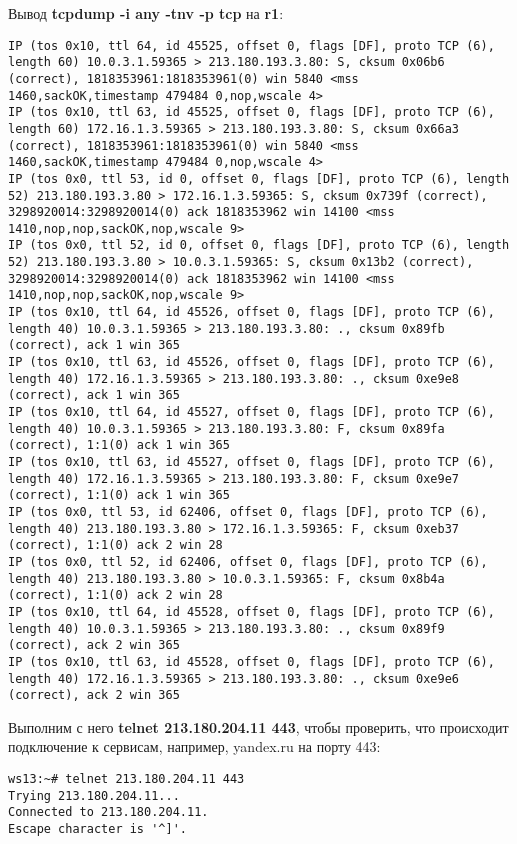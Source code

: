 \documentclass[a4paper,12pt]{article}
\begin{document}
Вывод \textbf{tcpdump -i any -tnv -p tcp} на \textbf{r1}:
\begin{Verbatim}
IP (tos 0x10, ttl 64, id 45525, offset 0, flags [DF], proto TCP (6), length 60) 10.0.3.1.59365 > 213.180.193.3.80: S, cksum 0x06b6 (correct), 1818353961:1818353961(0) win 5840 <mss 1460,sackOK,timestamp 479484 0,nop,wscale 4>
IP (tos 0x10, ttl 63, id 45525, offset 0, flags [DF], proto TCP (6), length 60) 172.16.1.3.59365 > 213.180.193.3.80: S, cksum 0x66a3 (correct), 1818353961:1818353961(0) win 5840 <mss 1460,sackOK,timestamp 479484 0,nop,wscale 4>
IP (tos 0x0, ttl 53, id 0, offset 0, flags [DF], proto TCP (6), length 52) 213.180.193.3.80 > 172.16.1.3.59365: S, cksum 0x739f (correct), 3298920014:3298920014(0) ack 1818353962 win 14100 <mss 1410,nop,nop,sackOK,nop,wscale 9>
IP (tos 0x0, ttl 52, id 0, offset 0, flags [DF], proto TCP (6), length 52) 213.180.193.3.80 > 10.0.3.1.59365: S, cksum 0x13b2 (correct), 3298920014:3298920014(0) ack 1818353962 win 14100 <mss 1410,nop,nop,sackOK,nop,wscale 9>
IP (tos 0x10, ttl 64, id 45526, offset 0, flags [DF], proto TCP (6), length 40) 10.0.3.1.59365 > 213.180.193.3.80: ., cksum 0x89fb (correct), ack 1 win 365
IP (tos 0x10, ttl 63, id 45526, offset 0, flags [DF], proto TCP (6), length 40) 172.16.1.3.59365 > 213.180.193.3.80: ., cksum 0xe9e8 (correct), ack 1 win 365
IP (tos 0x10, ttl 64, id 45527, offset 0, flags [DF], proto TCP (6), length 40) 10.0.3.1.59365 > 213.180.193.3.80: F, cksum 0x89fa (correct), 1:1(0) ack 1 win 365
IP (tos 0x10, ttl 63, id 45527, offset 0, flags [DF], proto TCP (6), length 40) 172.16.1.3.59365 > 213.180.193.3.80: F, cksum 0xe9e7 (correct), 1:1(0) ack 1 win 365
IP (tos 0x0, ttl 53, id 62406, offset 0, flags [DF], proto TCP (6), length 40) 213.180.193.3.80 > 172.16.1.3.59365: F, cksum 0xeb37 (correct), 1:1(0) ack 2 win 28
IP (tos 0x0, ttl 52, id 62406, offset 0, flags [DF], proto TCP (6), length 40) 213.180.193.3.80 > 10.0.3.1.59365: F, cksum 0x8b4a (correct), 1:1(0) ack 2 win 28
IP (tos 0x10, ttl 64, id 45528, offset 0, flags [DF], proto TCP (6), length 40) 10.0.3.1.59365 > 213.180.193.3.80: ., cksum 0x89f9 (correct), ack 2 win 365
IP (tos 0x10, ttl 63, id 45528, offset 0, flags [DF], proto TCP (6), length 40) 172.16.1.3.59365 > 213.180.193.3.80: ., cksum 0xe9e6 (correct), ack 2 win 365
\end{Verbatim}

Выполним с него \textbf{telnet 213.180.204.11 443},  чтобы проверить, что
происходит подключение к сервисам, например, yandex.ru на порту 443:
\begin{Verbatim}
ws13:~# telnet 213.180.204.11 443
Trying 213.180.204.11...
Connected to 213.180.204.11.
Escape character is '^]'.
\end{Verbatim}
\end{document}
